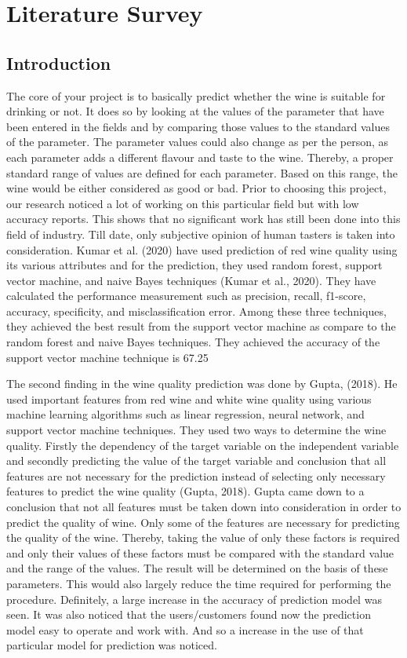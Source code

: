 \documentclass[a4paper, 12pt]{report}
\begin{document}
\chapter{Literature Survey}
\section{Introduction }
\par The core of your project is to basically predict whether the wine is suitable for drinking or not. It does so by looking at the values of the parameter that have been entered in the fields and by comparing those values to the standard values of the parameter. The parameter values could also change as per the person, as each parameter adds a different flavour and taste to the wine. Thereby, a proper standard range of values are defined for each parameter. Based on this range, the wine would be either considered as good or bad. Prior to choosing this project, our research noticed a lot of working on this particular field but with low accuracy reports. This shows that no significant work has still been done into this field of industry. Till date, only subjective opinion of human tasters is taken into consideration. Kumar et al. (2020) have used prediction of red wine quality using its various attributes and for the prediction, they used random forest, support vector machine, and naive Bayes techniques (Kumar et al., 2020). They have calculated the performance measurement such as precision, recall, f1-score, accuracy, specificity, and misclassification error. Among these three techniques, they achieved the best result from the support vector machine as compare to the random forest and naive Bayes techniques. They achieved the accuracy of the support vector machine technique is 67.25%
\\
\par The second finding in the wine quality prediction was done by Gupta, (2018). He  used important features from red wine and white wine quality using various machine learning algorithms such as linear regression, neural network, and support vector machine techniques. They used two ways to determine the wine quality. Firstly the dependency of the target variable on the independent variable and secondly predicting the value of the target variable and conclusion that all features are not necessary for the prediction instead of selecting only necessary features to predict the wine quality (Gupta, 2018). Gupta came down to a conclusion that not all features must be taken down into consideration in order to predict the quality of wine. Only some of the features are necessary for predicting the quality of the wine. Thereby, taking the value of only these factors is required and only their values of these factors must be compared with the standard value and the range of the values. The result will be determined on the basis of these parameters. This would also largely reduce the time required for performing the procedure. Definitely, a large increase in the accuracy of prediction model was seen. It was also noticed that the users/customers found now the prediction model easy to operate and work with. And so a increase in the use of that particular model for prediction was noticed.
\end{document}
